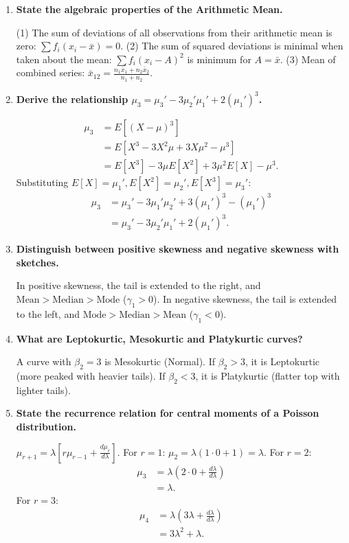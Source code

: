\documentclass[12pt,a4paper]{article}
\newcommand{\Q}[1]{\textbf{#1}\par\noindent\ignorespaces}
\begin{document}
\begin{tcolorbox}[exambox, title={\textbf{Frequently Asked / Viva Questions}}]
\begin{enumerate}[topsep=0pt, label=\textbf{Q\arabic*.}, itemsep=5pt]
  \item \Q{State the algebraic properties of the Arithmetic Mean.}
  (1) The sum of deviations of all observations from their arithmetic mean is zero: $\sum f_i (x_i - \bar{x}) = 0$. (2) The sum of squared deviations is minimal when taken about the mean: $\sum f_i (x_i - A)^2$ is minimum for $A = \bar{x}$. (3) Mean of combined series: $\bar{x}_{12} = \frac{n_1 \bar{x}_1 + n_2 \bar{x}_2}{n_1 + n_2}$.

  \item \Q{Derive the relationship $\mu_3 = \mu_3' - 3\mu_2'\mu_1' + 2(\mu_1')^3$.}

  \[
    \begin{aligned}
      \mu_3 &= E[(X - \mu)^3] \\[3pt]
      &= E[X^3 - 3X^2\mu + 3X\mu^2 - \mu^3] \\[3pt]
      &= E[X^3] - 3\mu E[X^2] + 3\mu^2 E[X] - \mu^3.
    \end{aligned}
  \]
   Substituting $E[X] = \mu_1', E[X^2] = \mu_2', E[X^3] = \mu_3'$:
  \[
    \begin{aligned}
      \mu_3 &= \mu_3' - 3\mu_1'\mu_2' + 3(\mu_1')^3 - (\mu_1')^3 \\[3pt]
      &= \mu_3' - 3\mu_2'\mu_1' + 2(\mu_1')^3.
    \end{aligned}
  \]

  \item \Q{Distinguish between positive skewness and negative skewness with sketches.}
  In positive skewness, the tail is extended to the right, and $\text{Mean} > \text{Median} > \text{Mode}$ ($\gamma_1 > 0$). In negative skewness, the tail is extended to the left, and $\text{Mode} > \text{Median} > \text{Mean}$ ($\gamma_1 < 0$).

  \item \Q{What are Leptokurtic, Mesokurtic and Platykurtic curves?}
  A curve with $\beta_2 = 3$ is Mesokurtic (Normal). If $\beta_2 > 3$, it is Leptokurtic (more peaked with heavier tails). If $\beta_2 < 3$, it is Platykurtic (flatter top with lighter tails).

  \item \Q{State the recurrence relation for central moments of a Poisson distribution.}
  $\mu_{r+1} = \lambda \left[r \mu_{r-1} + \frac{d\mu_r}{d\lambda}\right]$. For $r=1$: $\mu_2 = \lambda(1\cdot 0 + 1) = \lambda$. For $r=2$:
  \[
    \begin{aligned}
      \mu_3 &= \lambda(2\cdot 0 + \frac{d\lambda}{d\lambda}) \\[3pt]
      &= \lambda.
    \end{aligned}
  \]
   For $r=3$:
  \[
    \begin{aligned}
      \mu_4 &= \lambda(3\lambda + \frac{d\lambda}{d\lambda}) \\[3pt]
      &= 3\lambda^2 + \lambda.
    \end{aligned}
  \]


\end{enumerate}
\end{tcolorbox}
\end{document}

